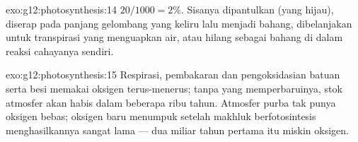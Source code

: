 \begin{solution}{exo:g12:photosynthesis:14}
$20/1000 = 2\%$. Sisanya dipantulkan (yang hijau), diserap pada panjang
gelombang yang keliru lalu menjadi bahang, dibelanjakan untuk
transpirasi yang menguapkan air, atau hilang sebagai bahang di dalam
reaksi cahayanya sendiri.
\end{solution}

\begin{solution}{exo:g12:photosynthesis:15}
Respirasi, pembakaran dan pengoksidasian batuan serta besi memakai
oksigen terus-menerus; tanpa  yang memperbaruinya, stok
atmosfer akan habis dalam beberapa ribu tahun. Atmosfer purba tak
punya oksigen bebas; oksigen baru menumpuk setelah makhluk berfotosintesis
menghasilkannya sangat lama --- dua miliar tahun pertama itu miskin
oksigen.
\end{solution}

